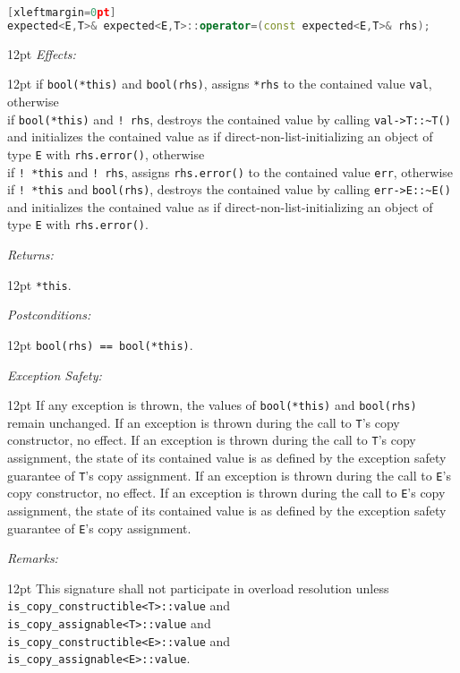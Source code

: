 \documentclass[a4paper,10pt]{article}
\newcommand{\cpp}[1]{\lstinline{#1}}
\newcommand{\wordingItem}[1]{\noindent\textit{#1:}}
\newenvironment{wordingTextItem}[1]{\wordingItem{#1}\vspace{2pt}\noindent\begin{adjustwidth}{12pt}{}}{\vspace{2pt}\end{adjustwidth}}
\newenvironment{wordingPara}{\begin{adjustwidth}{12pt}{}}{\end{adjustwidth}}
\begin{document}
\begin{lstlisting}[language=C++][xleftmargin=0pt]
expected<E,T>& expected<E,T>::operator=(const expected<E,T>& rhs); 
\end{lstlisting}
\begin{wordingPara}
\begin{wordingTextItem}{Effects}
if \cpp{bool(*this)} and \cpp{bool(rhs)}, assigns \cpp{*rhs} to the contained value \cpp{val}, otherwise \\
if \cpp{bool(*this)} and \cpp{! rhs}, destroys the contained value by calling \cpp{val->T::~T()} and  initializes the contained value as if direct-non-list-initializing an object of type \cpp{E} with \cpp{rhs.error()}, otherwise \\
if \cpp{! *this} and \cpp{! rhs}, assigns \cpp{rhs.error()} to the contained value \cpp{err}, otherwise \\
if \cpp{! *this} and \cpp{bool(rhs)}, destroys the contained value by calling \cpp{err->E::~E()} and  initializes the contained value as if direct-non-list-initializing an object of type \cpp{E} with \cpp{rhs.error()}.
\end{wordingTextItem}
\begin{wordingTextItem}{Returns}
\cpp{*this}.
\end{wordingTextItem}
\begin{wordingTextItem}{Postconditions}
\cpp{bool(rhs) == bool(*this)}.
\end{wordingTextItem}
\begin{wordingTextItem}{Exception Safety}
If any exception is thrown, the values of \cpp{bool(*this)} and \cpp{bool(rhs)} remain unchanged. If an exception is thrown during the call to \cpp{T}'s copy constructor, no effect. If an exception is thrown during the call to \cpp{T}'s copy assignment, the state of its contained value is as defined by the exception safety guarantee of \cpp{T}'s copy assignment. If an exception is thrown during the call to \cpp{E}'s copy constructor, no effect. If an exception is thrown during the call to \cpp{E}'s copy assignment, the state of its contained value is as defined by the exception safety guarantee of \cpp{E}'s copy assignment.
\end{wordingTextItem}
\begin{wordingTextItem}{Remarks}
This signature shall not participate in overload resolution unless\\
\cpp{is_copy_constructible<T>::value} and\\
\cpp{is_copy_assignable<T>::value} and\\
\cpp{is_copy_constructible<E>::value} and\\
\cpp{is_copy_assignable<E>::value}.
\end{wordingTextItem}

\end{wordingPara}
\end{document}
